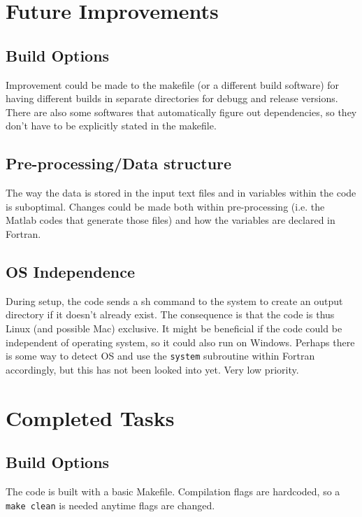 \documentclass[12pt]{article}
\begin{document}
    \newpage
    \section{Future Improvements}
    \subsection{Build Options}
    Improvement could be made to the makefile (or a different build software) for having different builds in separate directories for debugg and release versions. There are also some softwares that automatically figure out dependencies, so they don't have to be explicitly stated in the makefile.

    \subsection{Pre-processing/Data structure}
    The way the data is stored in the input text files and in variables within the code is suboptimal. Changes could be made both within pre-processing (i.e. the Matlab codes that generate those files) and how the variables are declared in Fortran.

    \subsection{OS Independence}
    During setup, the code sends a sh command to the system to create an output directory if it doesn't already exist. The consequence is that the code is thus Linux (and possible Mac) exclusive. It might be beneficial if the code could be independent of operating system, so it could also run on Windows. Perhaps there is some way to detect OS and use the \texttt{system} subroutine within Fortran accordingly, but this has not been looked into yet. Very low priority.

    \newpage
    \section{Completed Tasks}

    \subsection{Build Options}
    The code is built with a basic Makefile. Compilation flags are hardcoded, so a \texttt{make clean} is needed anytime flags are changed.
\end{document}
